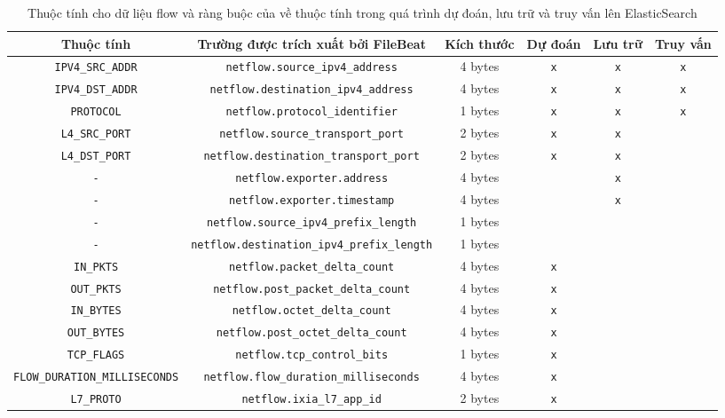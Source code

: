 \begin{table}[t]
    \centering
    \caption[Các ràng buộc về thuộc tính cho các quá trình]{Thuộc tính cho dữ liệu flow và ràng buộc của về thuộc tính trong quá trình dự đoán, lưu trữ và truy vấn lên ElasticSearch}
    \label{tab:needed-flow-features}
    \begin{adjustbox}{width=\textwidth}
    \begin{tabular}{|c|c|c|c|c|c|}
    \hline
    \textbf{Thuộc tính} & \textbf{Trường được trích xuất bởi FileBeat} & \textbf{Kích thước} & \textbf{Dự đoán} & \textbf{Lưu trữ} & \textbf{Truy vấn} \\
    \hline
    \texttt{IPV4\_SRC\_ADDR} & \texttt{netflow.source\_ipv4\_address} & 4 bytes  & \texttt{x} & \texttt{x} & \texttt{x} \\
    \hline
    \texttt{IPV4\_DST\_ADDR} & \texttt{netflow.destination\_ipv4\_address} & 4 bytes & \texttt{x} & \texttt{x} & \texttt{x} \\
    \hline
    \texttt{PROTOCOL} & \texttt{netflow.protocol\_identifier} & 1 bytes & \texttt{x} & \texttt{x} & \texttt{x} \\
    \hline
    \texttt{L4\_SRC\_PORT} & \texttt{netflow.source\_transport\_port} & 2 bytes & \texttt{x} & \texttt{x} &  \\
    \hline
    \texttt{L4\_DST\_PORT} & \texttt{netflow.destination\_transport\_port} & 2 bytes & \texttt{x} & \texttt{x} & \\
    \hline
    \texttt{-} & \texttt{netflow.exporter.address} & 4 bytes &  & \texttt{x} &  \\
    \hline
    \texttt{-} & \texttt{netflow.exporter.timestamp} & 4 bytes &  & \texttt{x} &  \\
    \hline
    \texttt{-} & \texttt{netflow.source\_ipv4\_prefix\_length} & 1 bytes & & &  \\
    \hline
    \texttt{-} & \texttt{netflow.destination\_ipv4\_prefix\_length} & 1 bytes & & &  \\
    \hline
    \texttt{IN\_PKTS} & \texttt{netflow.packet\_delta\_count} & 4 bytes & \texttt{x} & & \\
    \hline
    \texttt{OUT\_PKTS} & \texttt{netflow.post\_packet\_delta\_count} & 4 bytes & \texttt{x} & & \\
    \hline
    \texttt{IN\_BYTES} & \texttt{netflow.octet\_delta\_count} & 4 bytes & \texttt{x} & & \\
    \hline
    \texttt{OUT\_BYTES} & \texttt{netflow.post\_octet\_delta\_count} & 4 bytes & \texttt{x} & & \\
    \hline
    \texttt{TCP\_FLAGS} & \texttt{netflow.tcp\_control\_bits} & 1 bytes & \texttt{x} & & \\
    \hline
    \texttt{FLOW\_DURATION\_MILLISECONDS} & \texttt{netflow.flow\_duration\_milliseconds} & 4 bytes & \texttt{x} & & \\
    \hline
    \texttt{L7\_PROTO} & \texttt{netflow.ixia\_l7\_app\_id} & 2 bytes & \texttt{x} & & \\
    \hline
    \end{tabular}
    \end{adjustbox}
\end{table}

